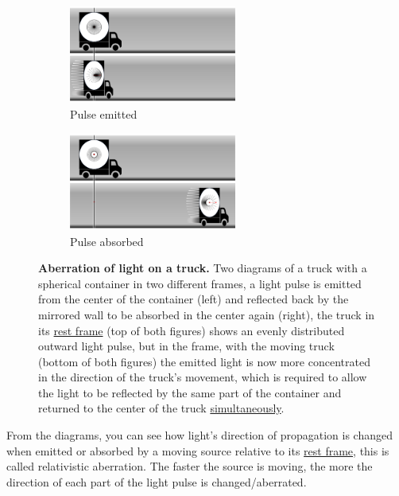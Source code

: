 \begin{figure}[htbp]
	\centering
	\begin{subfigure}{.49\textwidth}
		\centering
		\includegraphics[width = 5.5cm]{images/pdf/Aberrated_lorrys_1.pdf}
		\caption{Pulse emitted}
		\label{fig: truck aberrated 1}
	\end{subfigure}
	\begin{subfigure}{.49\textwidth}
		\centering
		\includegraphics[width = 5.5cm]{images/pdf/Aberrated_lorrys_2.pdf}
		\caption{Pulse absorbed}
		\label{fig: truck aberrated 2}
	\end{subfigure}
	\caption{\textbf{Aberration of light on a truck.} Two diagrams of a truck with a spherical container in two different frames, a light pulse is emitted from the center of the container (left) and reflected back by the mirrored wall to be absorbed in the center again (right), the truck in its \protect\hyperlink{def-proper-frame}{rest frame} (top of both figures) shows an evenly distributed outward light pulse, but in the frame, with the moving truck (bottom of both figures) the emitted light is now more concentrated in the direction of the truck's movement, which is required to allow the light to be reflected by the same part of the container and returned to the center of the truck \protect\hyperlink{def-simultaneity}{simultaneously}.}
	\label{fig: truck aberrated}
\end{figure}

%

From the diagrams, you can see how light's direction of propagation is changed when emitted or absorbed by a moving source relative to its \hyperlink{def-proper-frame}{rest frame}, this is called relativistic aberration. The faster the source is moving, the more the direction of each part of the light pulse is changed/aberrated.


